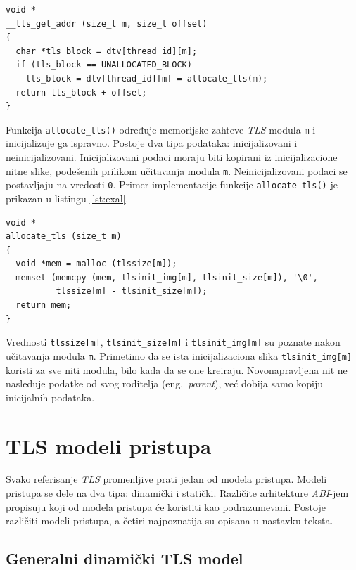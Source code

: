 \documentclass[12pt,oneside]{memoir}
\begin{document}
\begin{lstlisting}[style=customc, label={lst:ex2}, caption={Promena implementacije funkcije \texttt{\_\_tls\_get\_addr()}}]
void *
__tls_get_addr (size_t m, size_t offset)
{
  char *tls_block = dtv[thread_id][m];
  if (tls_block == UNALLOCATED_BLOCK)
    tls_block = dtv[thread_id][m] = allocate_tls(m);
  return tls_block + offset;
}

\end{lstlisting}

Funkcija \texttt{allocate\_tls()} određuje memorijske zahteve \emph{TLS} modula \texttt{m} i inicijalizuje ga ispravno. Postoje dva tipa podataka: inicijalizovani i neinicijalizovani. Inicijalizovani podaci moraju biti kopirani iz inicijalizacione nitne slike, podešenih prilikom učitavanja modula \texttt{m}. Neinicijalizovani podaci se postavljaju na vredosti \texttt{0}. Primer implementacije funkcije \texttt{allocate\_tls()} je prikazan u listingu \ref{lst:exal}.\newpage

\begin{lstlisting}[style=customc, label={lst:exal}, caption={Implementacija funkcije \texttt{allocate\_tls()}}]
void *
allocate_tls (size_t m)
{
  void *mem = malloc (tlssize[m]);
  memset (memcpy (mem, tlsinit_img[m], tlsinit_size[m]), '\0',
          tlssize[m] - tlsinit_size[m]);
  return mem;
}

\end{lstlisting}

Vrednosti \texttt{tlssize[m]}, \texttt{tlsinit\_size[m]} i \texttt{tlsinit\_img[m]} su poznate nakon učitavanja modula \texttt{m}. Primetimo da se ista inicijalizaciona slika \texttt{tlsinit\_img[m]} koristi za sve niti modula, bilo kada da se one kreiraju. Novonapravljena nit ne nasleđuje podatke od svog roditelja (eng.~\emph{parent}), već dobija samo kopiju inicijalnih podataka.

\section{TLS modeli pristupa}
\label{sec:tlsmodeli}

Svako referisanje \emph{TLS} promenljive prati jedan od modela pristupa. Modeli pristupa se dele na dva tipa: dinamički i statički. Različite arhitekture \emph{ABI}-jem propisuju koji od modela pristupa će koristiti kao podrazumevani. Postoje različiti modeli pristupa, a četiri najpoznatija su opisana u nastavku teksta.

\subsection{Generalni dinamički TLS model}
\end{document}
